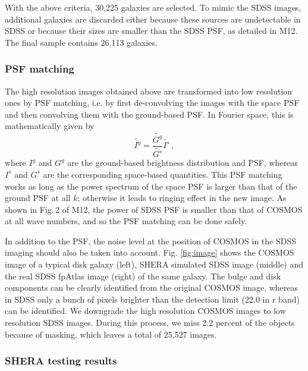 \documentclass[apj]{emulateapj}
\begin{document}
 With the above criteria, 30,225 galaxies are selected.  To mimic
the SDSS images, additional galaxies are discarded either because 
these sources are undetectable in SDSS or because their sizes are smaller 
than the SDSS PSF, as detailed in M12. The final
sample contains 26,113 galaxies.

\subsubsection{PSF matching}

The high resolution images obtained above are transformed into low
resolution ones by PSF matching, i.e. by first de-convolving the 
images with the space PSF and then convolving them with the 
ground-based PSF.  In Fourier space, this is mathematically given by 
\begin{equation}
\tilde{I^g}=\frac{\tilde{G^g}}{\tilde{G^s}}\tilde{I^s}\,,
\end{equation}
where $I^g$ and $G^g$ are the ground-based brightness distribution
and PSF,  whereas $I^s$ and $G^s$ are the corresponding 
space-based quantities. This PSF matching works as long as 
the power spectrum of the space PSF is larger than that of the
ground PSF at all $k$; otherwise it leads to ringing effect in the
new image.  As shown in Fig.\,2 of M12, 
the power of SDSS PSF is smaller than that of COSMOS at all 
wave numbers, and so the PSF matching can be done safely.

In addition to the PSF, the noise level at the position of COSMOS in the
SDSS imaging should also be taken into account. Fig. \ref{fig:image} shows
the COSMOS image of a typical disk galaxy (left), SHERA simulated SDSS
image (middle) and the real SDSS fpAtlas image (right)
of the same galaxy. The bulge and disk components 
can be clearly identified from the original COSMOS image, 
whereas in SDSS only a bunch of pixels brighter than the detection limit 
(22.0 in r band) can be identified.  
We downgrade the high resolution COSMOS images to low 
resolution SDSS images. During this process, we miss 2.2 percent 
of the objects because of masking, which leaves a total of 25,527 
images.

\subsubsection{SHERA testing results}
\end{document}
